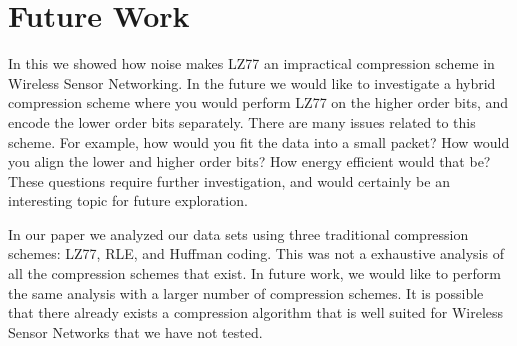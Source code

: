 \section{Future Work}

In this we showed how noise makes LZ77 an impractical compression
scheme in Wireless Sensor Networking. In the future we would like to
investigate a hybrid compression scheme where you would perform LZ77
on the higher order bits, and encode the lower order bits
separately. There are many issues related to this scheme. For example,
how would you fit the data into a small packet? How would you align
the lower and higher order bits? How energy efficient would that be?
These questions require further investigation, and would certainly be
an interesting topic for future exploration.

In our paper we analyzed our data sets using three traditional
compression schemes: LZ77, RLE, and Huffman coding. This was not a
exhaustive analysis of all the compression schemes that exist. In
future work, we would like to perform the same analysis with a larger
number of compression schemes. It is possible that there already
exists a compression algorithm that is well suited for Wireless Sensor
Networks that we have not tested. 

 
